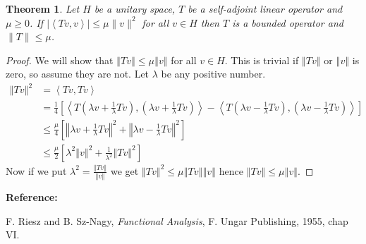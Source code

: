 \documentclass[12pt]{article}
\newcommand{\ip}[2]{\left\langle #1,#2\right\rangle}
\newcommand{\norm}[1]{\left\Vert #1 \right\Vert}
\newtheorem*{theorem}{Theorem}
\begin{document}
\begin{theorem}
Let $H$ be a unitary space, $T$ be a self-adjoint
linear operator and $\mu\geq 0$.  If $\vert\ip{Tv}{v}\vert\leq \mu
\|v\|^2$ for all $v\in H$ then $T$ is a bounded operator and
$\|T\|\leq \mu$.
\end{theorem}



\begin{proof}
 We will show that $\norm{Tv}\leq \mu\norm{v}$ for all $v\in H$.
This is trivial if $\norm{Tv}$ or $\norm{v}$ is zero, so assume
they are not. Let $\lambda$ be any positive number.
\begin{align*}
\norm{Tv}^2 & = \ip{Tv}{Tv}\\
&=\frac{1}{4}\left[ \ip{T\left(\lambda v +
\frac{1}{\lambda}Tv\right)}{\left(\lambda v +
\frac{1}{\lambda}Tv\right)} - \ip{T\left(\lambda v -
\frac{1}{\lambda}Tv\right)}{\left(\lambda v
-\frac{1}{\lambda}Tv\right)}\right]\\
&\leq \frac{\mu}{4}\left[\norm{\lambda v + \frac{1}{\lambda}Tv}^2
+\norm{\lambda v - \frac{1}{\lambda}Tv}^2 \right]\\
&\leq\frac{\mu}{2}\left[\lambda^2\norm{v}^2 +
\frac{1}{\lambda^2}\norm{Tv}^2 \right]
\end{align*}
Now if we put $\displaystyle \lambda^2 =
\frac{\norm{Tv}}{\norm{v}}$ we get $\norm{Tv}^2 \leq
\mu\norm{Tv}\norm{v}$ hence $\norm{Tv}\leq \mu \norm{v}$.
\end{proof}

\textbf{ Reference:}

F. Riesz  and B. Sz-Nagy, \emph{Functional Analysis}, F. Ungar
Publishing, 1955, chap VI.
\end{document}

